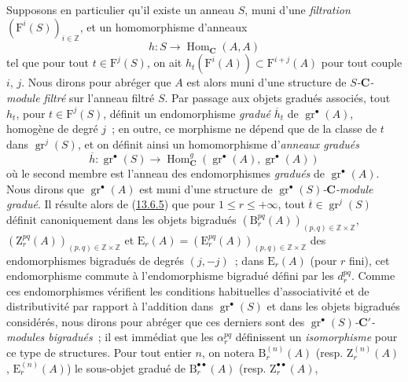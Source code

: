 \begin{env}[13.6.6]
\label{0.13.6.6-fr}
Supposons en particulier qu'il existe un anneau $S$, muni d'une
\emph{filtration} $(\mathrm F^i(S))_{i\in\mathbb Z}$, et un homomorphisme
d'anneaux
\begin{equation}
\label{0.13.6.6.1-fr}
\tag{13.6.6.1}
h:S\to\operatorname{Hom}_{\boldsymbol{C}}(A,A)
\end{equation}
tel que pour tout $t\in\mathrm F^j(S)$, on ait
$h_t(\mathrm F^i(A))\subset\mathrm F^{i+j}(A)$ pour tout couple $i$,
$j$. Nous dirons pour abréger que $A$ est alors muni d'une structure de
\emph{$S$-$\boldsymbol{C}$-module filtré} sur l'anneau filtré $S$. Par passage aux
objets gradués associés, tout $h_t$, pour $t\in\mathrm F^j(S)$, définit
un endomorphisme \emph{gradué} $\overline h_t$ de
$\operatorname{gr}^\bullet(A)$, homogène de degré $j$~; en outre, ce
morphisme ne dépend que de la classe de $t$ dans
$\operatorname{gr}^j(S)$, et on définit ainsi un homomorphisme d'\emph{anneaux
gradués}
\[
\overline h:\operatorname{gr}^\bullet(S)\to
\operatorname{Hom}_{\boldsymbol{C}}^g(\operatorname{gr}^\bullet(A),
\operatorname{gr}^\bullet(A))
\]
où le second membre est l'anneau des endomorphismes \emph{gradués} de
$\operatorname{gr}^\bullet(A)$. Nous dirons que
$\operatorname{gr}^\bullet(A)$ est muni d'une structure de
\emph{$\operatorname{gr}^\bullet(S)$-$\boldsymbol{C}$-module gradué}. Il résulte alors
de (\hyperref[0.13.6.5-fr]{13.6.5}) que pour
$1\leq r\leq+\infty$, tout
$\overline t\in\operatorname{gr}^j(S)$ définit canoniquement dans les
objets bigradués
$(\mathrm B_r^{pq}(A))_{(p,q)\in\mathbb Z\times\mathbb Z}$,
$(\mathrm Z_r^{pq}(A))_{(p,q)\in\mathbb Z\times\mathbb Z}$ et
$\mathrm E_r(A)=(\mathrm E_r^{pq}(A))_{(p,q)\in\mathbb Z\times\mathbb Z}$
des endomorphismes bigradués de degrés $(j,-j)$~; dans
$\mathrm E_r(A)$ (pour $r$ fini), cet endomorphisme commute à
l'endomorphisme bigradué défini par les $d_r^{pq}$. Comme ces
endomorphismes vérifient les conditions habituelles d'associativité et
de distributivité par rapport à l'addition dans
$\operatorname{gr}^\bullet(S)$ et dans les objets bigradués considérés,
nous dirons pour abréger que ces derniers sont des
\emph{$\operatorname{gr}^\bullet(S)$-$\boldsymbol{C}'$-modules bigradués}~; il est
immédiat que les $\alpha_r^{pq}$ définissent un \emph{isomorphisme} pour ce type
de structures. Pour tout entier $n$, on notera
$\mathrm B_r^{(n)}(A)$ (resp. $\mathrm Z_r^{(n)}(A)$,
$\mathrm E_r^{(n)}(A)$) le sous-objet gradué de
$\mathrm B_r^{\bullet\bullet}(A)$ (resp. $\mathrm Z_r^{\bullet\bullet}(A)$,

\end{env}
